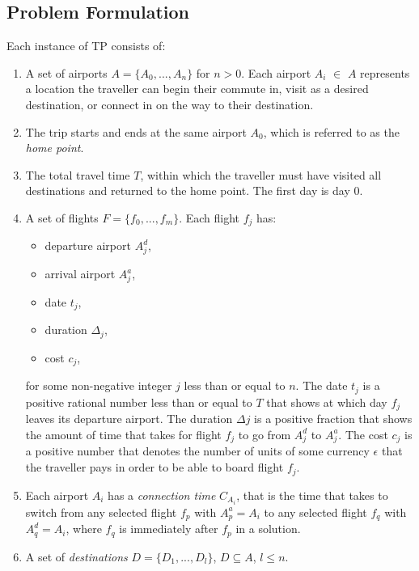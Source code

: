 \documentclass{mpaper}
\begin{document}
\subsection{Problem Formulation}
\label{sec:tpformulation}
Each instance of TP consists of:
\begin{enumerate}[topsep=0.1pt]
\setlength\itemsep{0.1em}
\item A set of airports $A = \{ A_{0},...,A_{n} \}$ for $n > 0$. Each airport $A_{i}$ $\in$ $A$ represents a location the traveller can begin their commute in, visit as a desired destination, or connect in on the way to their destination.

\item The trip starts and ends at the same airport $A_{0}$, which is referred to as the \textit{home point}.

\item The total travel time $T$, within which the traveller must have visited all destinations and returned to the home point. The first day is day 0.
 
\item A set of flights $F = \{ f_{0},...,f_{m} \}$. Each flight $f_{j}$ has:
\begin{itemize}[topsep=1pt]
\setlength\itemsep{0.1em}
\item departure airport $A^{d}_{j}$,
\item arrival airport $A^{a}_{j}$,
\item date $t_{j}$,
\item duration $\Delta_{j}$,
\item cost $c_{j}$,
\end{itemize} 
for some non-negative integer $j$ less than or equal to $n$.
The date $t_{j}$ is a positive rational number less than or equal to $T$ that shows at which day $f_{j}$ leaves its departure airport. The duration $\Delta{j}$ is a positive fraction that shows the amount of time that takes for flight $f_{j}$ to go from $A^{d}_{j}$ to $A^{a}_{j}$. The cost $c_{j}$ is a positive number that denotes the number of units of some currency $\epsilon$ that the traveller pays in order to be able to board flight $f_{j}$.

\item Each airport $A_{i}$ has a \textit{connection time} $C_{A_{i}}$, that is the time that takes to switch from any selected flight $f_{p}$ with $A^{a}_{p} = A_{i}$ to any selected flight $f_{q}$ with $A^{d}_{q} = A_{i}$, where $f_{q}$ is immediately after $f_{p}$ in a solution.

\item A set of \textit{destinations} $D = \{ D_{1},...,D_{l} \}$, $D \subseteq A$, $l \leq n$.
\end{enumerate}
\end{document}
